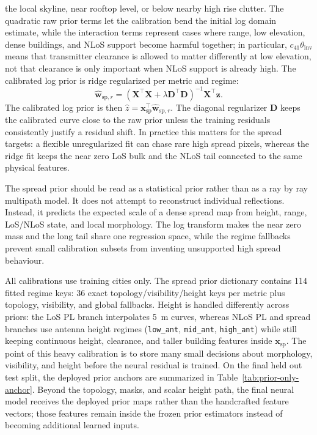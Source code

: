 \documentclass[journal]{IEEEtran}
\begin{document}
the local skyline, near rooftop level, or below nearby high rise clutter. The
quadratic raw prior terms let the calibration bend the initial log domain
estimate, while the interaction terms represent cases where range, low
elevation, dense buildings, and NLoS support become harmful together; in
particular, \(c_{41}\theta_{\mathrm{inv}}\) means that transmitter clearance is
allowed to matter differently at low elevation, not that clearance is only
important when NLoS support is already high. The
calibrated log prior is ridge regularized per metric and regime:
\begin{equation}
\hat{\mathbf{w}}_{\mathrm{sp},r}
=
\left(\mathbf{X}^{\top}\mathbf{X}
+\lambda\mathbf{D}^{\top}\mathbf{D}\right)^{-1}
\mathbf{X}^{\top}\mathbf{z}.
\label{eq:ridge-paper}
\end{equation}
The calibrated log prior is then
\(\hat z=\mathbf{x}_{\mathrm{sp}}^{\top}\hat{\mathbf{w}}_{\mathrm{sp},r}\).
The diagonal regularizer \(\mathbf{D}\) keeps the calibrated curve close to the
raw prior unless the training residuals consistently justify a residual shift. In
practice this matters for the spread targets: a flexible unregularized fit can
chase rare high spread pixels, whereas the ridge fit keeps the near zero LoS
bulk and the NLoS tail connected to the same physical features.

The spread prior should be read as a statistical prior rather than as a
ray by ray multipath model. It does not attempt to reconstruct individual
reflections. Instead, it predicts the expected scale of a dense spread map from
height, range, LoS/NLoS state, and local morphology. The log transform makes
the near zero mass and the long tail share one regression space, while the
regime fallbacks prevent small calibration subsets from inventing unsupported
high spread behaviour.

All calibrations use training cities only. The spread prior dictionary contains
114 fitted regime keys: \(36\) exact topology/visibility/height keys per
metric plus topology, visibility, and global fallbacks. Height is handled
differently across priors: the LoS PL branch interpolates \SI{5}{m} curves,
whereas NLoS PL and spread branches use antenna height regimes
(\texttt{low\_ant}, \texttt{mid\_ant}, \texttt{high\_ant}) while still keeping
continuous height, clearance, and taller building features inside
\(\mathbf{x}_{\mathrm{sp}}\). The point of this heavy calibration is to store many small
decisions about morphology, visibility, and height before the neural residual
is trained. On the final held out test split, the deployed prior anchors are
summarized in Table~\ref{tab:prior-only-anchor}.
Beyond the topology, masks, and scalar height path, the final neural model
receives the deployed prior maps rather than the handcrafted feature vectors;
those features remain inside the frozen prior estimators instead of becoming
additional learned inputs.
\end{document}
